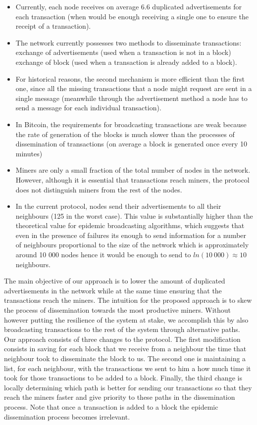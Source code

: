 \documentclass{dads}   %
\begin{document}
\begin{itemize}
  \item Currently, each node receives on average $6.6$ duplicated advertisements for each transaction (when would be enough receiving a single one to ensure the receipt of a transaction).
  \item The network currently possesses two methods to disseminate transactions: exchange of advertisements (used when a transaction is not in a block) exchange of block (used when a transaction is already added to a block).
  \item For historical reasons, the second mechanism is more efficient than the first one, since all the missing transactions that a node might request are sent in a single message (meanwhile through the advertisement method a node has to send a message for each individual transaction).
  \item In Bitcoin, the requirements for broadcasting transactions are weak because the rate of generation of the blocks is much slower than the processes of dissemination of transactions (on average a block is generated once every 10 minutes)
  \item Miners are only a small fraction of the total number of nodes in the network. However, although it is essential that transactions reach miners, the protocol does not distinguish miners from the rest of the nodes.
  \item In the current protocol, nodes send their advertisements to all their neighbours (125 in the worst case). This value is substantially higher than the theoretical value for epidemic broadcasting algorithms, which suggests that even in the presence of failures its enough to send information for a number of neighbours proportional to the size of the network which is approximately around 10 000 nodes hence it would be enough to send to $ ln(10~000) \approx 10$ neighbours.
\end{itemize}

The main objective of our approach is to lower the amount of duplicated advertisements in the network while at the same time ensuring that the transactions reach the miners. The intuition for the proposed approach is to skew the process of dissemination towards the most productive miners. Without however putting the resilience of the system at stake, we accomplish this by also broadcasting transactions to the rest of the system through alternative paths. Our approach consists of three changes to the protocol. The first modification consists in saving for each block that we receive from a neighbour the time that neighbour took to disseminate the block to us. The second one is maintaining a list, for each neighbour, with the transactions we sent to him a how much time it took for those transactions to be added to a block. Finally, the third change is locally determining which path is better for sending our transactions so that they reach the miners faster and give priority to these paths in the dissemination process. Note that once a transaction is added to a block the epidemic dissemination process becomes irrelevant.
\end{document}
